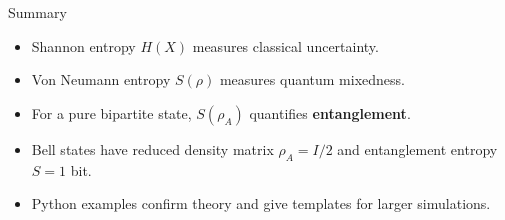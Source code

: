 \documentclass{beamer}
\begin{document}
\begin{frame}{Summary}
\begin{itemize}
    \item Shannon entropy $H(X)$ measures classical uncertainty.
    \item Von Neumann entropy $S(\rho)$ measures quantum mixedness.
    \item For a pure bipartite state, $S(\rho_A)$ quantifies \textbf{entanglement}.
    \item Bell states have reduced density matrix $\rho_A=I/2$ and entanglement entropy $S=1$ bit.
    \item Python examples confirm theory and give templates for larger simulations.
\end{itemize}
\end{frame}
\end{document}
